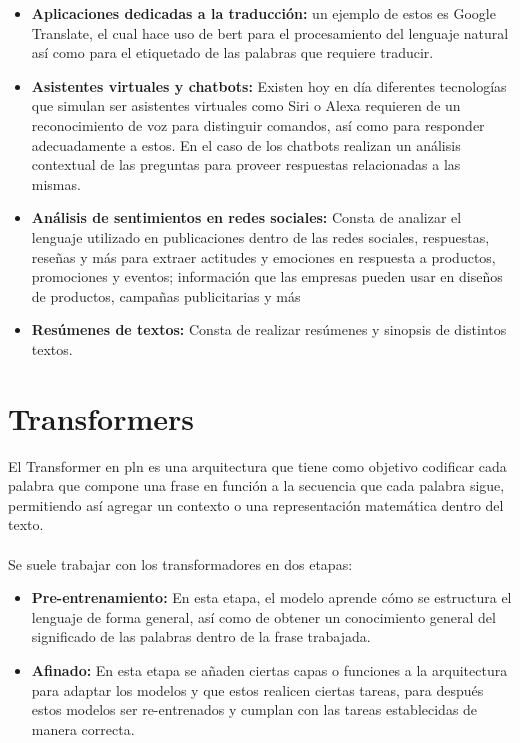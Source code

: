 \documentclass[12pt, a4paper, titlepage]{report}
\begin{document}
		    	\begin{itemize}
		    		\item \textbf{Aplicaciones dedicadas a la traducción: }un ejemplo de estos es Google Translate, el cual hace uso de \acrshort{bert} para el procesamiento del lenguaje natural así como para el etiquetado de las palabras que requiere traducir.
		    		\item \textbf{Asistentes virtuales y chatbots: } Existen hoy en día diferentes tecnologías que simulan ser asistentes virtuales como Siri o Alexa requieren de un reconocimiento de voz para distinguir comandos, así como para responder adecuadamente a estos. En el caso de los chatbots realizan un análisis contextual de las preguntas para proveer respuestas relacionadas a las mismas.
		    		\item \textbf{Análisis de sentimientos en redes sociales: }Consta de analizar el lenguaje utilizado en publicaciones dentro de las redes sociales, respuestas, reseñas y más para extraer actitudes y emociones en respuesta a productos, promociones y eventos; información que las empresas pueden usar en diseños de productos, campañas publicitarias y más
		    		\item \textbf{Resúmenes de textos: }Consta de realizar resúmenes y sinopsis de distintos textos.
		    	\end{itemize} 
        
        \section{Transformers}
        El Transformer en \acrfull{pln} es una arquitectura que tiene como objetivo codificar cada palabra que compone una frase en función a la secuencia que cada palabra sigue, permitiendo así agregar un contexto o una representación matemática dentro del texto.\\\\    
        Se suele trabajar con los transformadores en dos etapas: 
        \begin{itemize}
        	\item \textbf{Pre-entrenamiento: }En esta etapa, el modelo aprende cómo se estructura el lenguaje de forma general, así como de obtener un conocimiento general del significado de las palabras dentro de la frase trabajada.\cite{refQueesuntransformer}
        	\item \textbf{Afinado: }En esta etapa se añaden ciertas capas o funciones a la arquitectura para adaptar los modelos y que estos realicen ciertas tareas, para después estos modelos ser re-entrenados y cumplan con las tareas establecidas de manera correcta.\cite{refQueesuntransformer}
        \end{itemize}  
   
\end{document}
